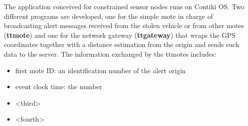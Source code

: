 \documentclass[]{article}
\begin{document}
The application conceived for constrained sensor nodes runs on Contiki OS. Two different programs are developed, one for the simple mote in charge of broadcasting alert messages received from the stolen vehicle or from other motes (\textbf{ttmote}) and one for the network gateway (\textbf{ttgateway}) that wraps the GPS coordinates together with a distance estimation from the origin and sends such data to the server. The information exchanged by the ttmotes includes:
\begin{itemize}
	\item first mote ID: an identification number of the alert origin
	\item event clock time: the number 
	\item <third>
	\item <fourth>
\end{itemize}
\end{document}
